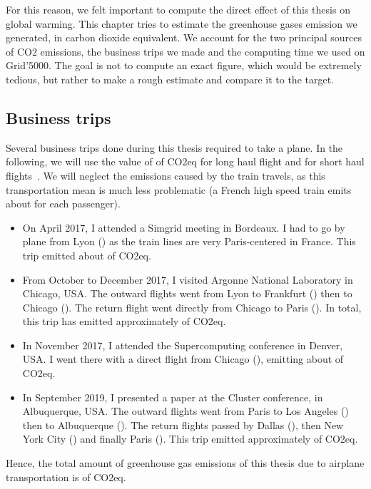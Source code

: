     For this reason, we felt important to compute the direct effect of this thesis on global warming. This chapter tries
    to estimate the greenhouse gases emission we generated, in carbon dioxide equivalent. We account for the two
    principal sources of CO2 emissions, \ie the business trips we made and the computing time we used on Grid'5000.
    The goal is not to compute an exact figure, which would be extremely tedious, but rather to make a rough estimate
    and compare it to the  target.

    \subsection*{Business trips}%

        Several business trips done during this thesis required to take a plane. In the following, we will use the value
        of  of CO2eq for long haul flight and  for short haul
        flights~\cite{co2_flight}. We will neglect the emissions caused by the train travels, as this transportation
        mean is much less problematic (a French high speed train emits about  for each
        passenger).
        \begin{itemize}
            \item On April 2017, I attended a Simgrid meeting in Bordeaux. I had to go by plane from Lyon
                () as the train lines are very Paris-centered in France. This trip emitted about
                 of CO2eq.
            \item From October to December 2017, I visited Argonne National Laboratory in Chicago, USA. The outward
                flights went from Lyon to Frankfurt () then to Chicago ().
                The return flight went directly from Chicago to Paris ().  In total, this trip has
                emitted approximately  of CO2eq.
            \item In November 2017, I attended the Supercomputing conference in Denver, USA. I went there with a direct
                flight from Chicago (), emitting about  of CO2eq.
            \item In September 2019, I presented a paper at the Cluster conference, in Albuquerque, USA. The outward
                flights went from Paris to Los Angeles () then to Albuquerque
                (). The return flights passed by Dallas (), then New York
                City () and finally Paris (). This trip emitted
                approximately  of CO2eq.
        \end{itemize}
        Hence, the total amount of greenhouse gas emissions of this thesis due to airplane transportation is
         of CO2eq.

